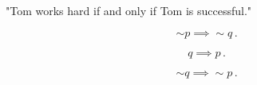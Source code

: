 %
%

\begin{subquestions}


\subquestion

"Tom works hard if and only if Tom is successful."

	
\subquestion 

\begin{subsubquestions}
	
\subsubquestion

\begin{equation}
	\sim p \implies \sim q\,.
\end{equation}

\subsubquestion

\begin{equation}
	q \implies p\,.
\end{equation}

\subsubquestion

\begin{equation}
	\sim q \implies \sim p\,.
\end{equation}

\end{subsubquestions}


\subquestion


\end{subquestions}
